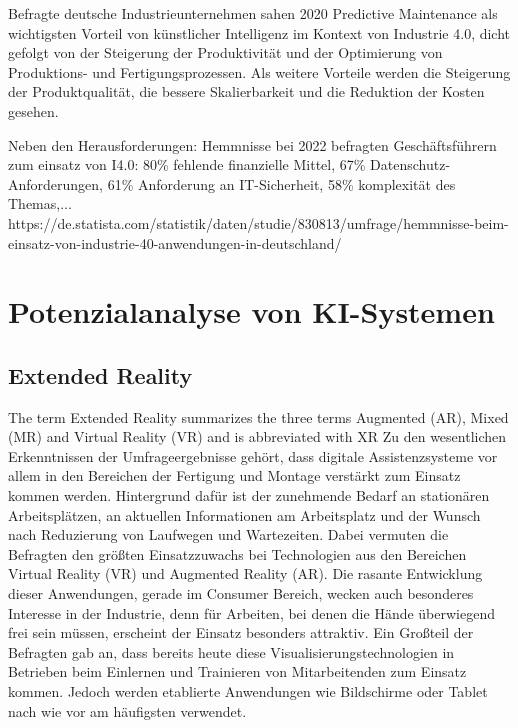 \documentclass[a4paper,12pt, german]{report}
\begin{document}
Befragte deutsche Industrieunternehmen sahen 2020 Predictive Maintenance als wichtigsten Vorteil von künstlicher Intelligenz im Kontext von Industrie 4.0, dicht gefolgt von der Steigerung der Produktivität und der Optimierung von Produktions- und Fertigungsprozessen. Als weitere Vorteile werden die Steigerung der Produktqualität, die bessere Skalierbarkeit und die Reduktion der Kosten gesehen.\cite{28}

Neben den Herausforderungen:
Hemmnisse bei 2022 befragten Geschäftsführern zum einsatz von I4.0: 80\% fehlende finanzielle Mittel, 67\% Datenschutz-Anforderungen, 61\% Anforderung an IT-Sicherheit, 58\% komplexität des Themas,... https://de.statista.com/statistik/daten/studie/830813/umfrage/hemmnisse-beim-einsatz-von-industrie-40-anwendungen-in-deutschland/






\section{Potenzialanalyse von KI-Systemen}

\subsection{Extended Reality}
The term Extended Reality summarizes the three terms Augmented (AR), Mixed (MR) and Virtual Reality (VR) and is abbreviated with XR
Zu den wesentlichen Erkenntnissen der Umfrageergebnisse gehört, dass digitale Assistenzsysteme vor allem in den Bereichen der Fertigung und Montage verstärkt zum Einsatz kommen werden. Hintergrund dafür ist der zunehmende Bedarf an stationären Arbeitsplätzen, an aktuellen Informationen am Arbeitsplatz und der Wunsch nach Reduzierung von Laufwegen und Wartezeiten. Dabei vermuten die Befragten den größten Einsatzzuwachs bei Technologien aus den Bereichen Virtual Reality (VR) und Augmented Reality (AR). Die rasante Entwicklung dieser Anwendungen, gerade im Consumer Bereich, wecken auch besonderes Interesse in der Industrie, denn für Arbeiten, bei denen die Hände überwiegend frei sein müssen, erscheint der Einsatz besonders attraktiv. Ein Großteil der Befragten gab an, dass bereits heute diese Visualisierungstechnologien in Betrieben beim Einlernen und Trainieren von Mitarbeitenden zum Einsatz kommen. Jedoch werden etablierte Anwendungen wie Bildschirme oder Tablet nach wie vor am häufigsten verwendet.
\end{document}
